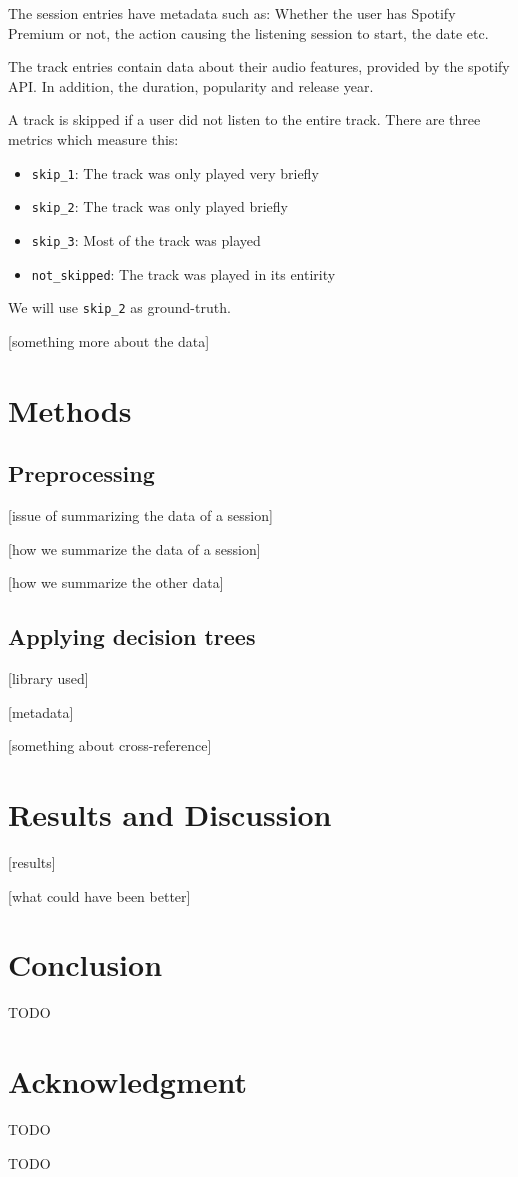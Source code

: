\documentclass[conference]{IEEEtran}
\begin{document}
The session entries have metadata such as: Whether the user has Spotify Premium or not, the action causing the listening session to start, the date etc. 


The track entries contain data about their audio features, provided by the spotify API. In addition, the duration, popularity and release year.

A track is skipped if a user did not listen to the entire track. There are three metrics which measure this: 
\begin{itemize}
	\item \verb|skip_1|: The track was only played very briefly
	\item \verb|skip_2|: The track was only played briefly
	\item \verb|skip_3|: Most of the track was played
	\item \verb|not_skipped|: The track was played in its entirity
\end{itemize}
We will use \verb|skip_2| as ground-truth.

[something more about the data]

\section{Methods}
\subsection{Preprocessing}
[issue of summarizing the data of a session]

[how we summarize the data of a session]

[how we summarize the other data]


\subsection{Applying decision trees}
[library used]

[metadata]

[something about cross-reference]

\section{Results and Discussion}
[results]

[what could have been better]

\section{Conclusion}
TODO

\section*{Acknowledgment}
TODO



\begin{thebibliography}{00}
 TODO
\end{thebibliography}
\end{document}
